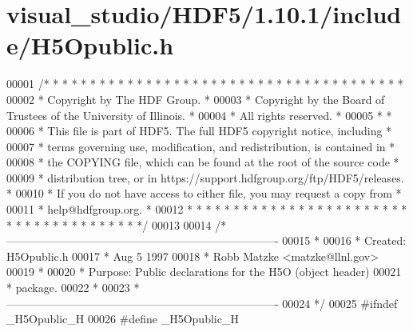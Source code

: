 \hypertarget{visual__studio_2_h_d_f5_21_810_81_2include_2_h5_opublic_8h_source}{}\section{visual\+\_\+studio/\+H\+D\+F5/1.10.1/include/\+H5\+Opublic.h}
\label{visual__studio_2_h_d_f5_21_810_81_2include_2_h5_opublic_8h_source}

\begin{DoxyCode}
00001 \textcolor{comment}{/* * * * * * * * * * * * * * * * * * * * * * * * * * * * * * * * * * * * * * *}
00002 \textcolor{comment}{ * Copyright by The HDF Group.                                               *}
00003 \textcolor{comment}{ * Copyright by the Board of Trustees of the University of Illinois.         *}
00004 \textcolor{comment}{ * All rights reserved.                                                      *}
00005 \textcolor{comment}{ *                                                                           *}
00006 \textcolor{comment}{ * This file is part of HDF5.  The full HDF5 copyright notice, including     *}
00007 \textcolor{comment}{ * terms governing use, modification, and redistribution, is contained in    *}
00008 \textcolor{comment}{ * the COPYING file, which can be found at the root of the source code       *}
00009 \textcolor{comment}{ * distribution tree, or in https://support.hdfgroup.org/ftp/HDF5/releases.  *}
00010 \textcolor{comment}{ * If you do not have access to either file, you may request a copy from     *}
00011 \textcolor{comment}{ * help@hdfgroup.org.                                                        *}
00012 \textcolor{comment}{ * * * * * * * * * * * * * * * * * * * * * * * * * * * * * * * * * * * * * * */}
00013 
00014 \textcolor{comment}{/*-------------------------------------------------------------------------}
00015 \textcolor{comment}{ *}
00016 \textcolor{comment}{ * Created:             H5Opublic.h}
00017 \textcolor{comment}{ *                      Aug  5 1997}
00018 \textcolor{comment}{ *                      Robb Matzke <matzke@llnl.gov>}
00019 \textcolor{comment}{ *}
00020 \textcolor{comment}{ * Purpose:             Public declarations for the H5O (object header)}
00021 \textcolor{comment}{ *                      package.}
00022 \textcolor{comment}{ *}
00023 \textcolor{comment}{ *-------------------------------------------------------------------------}
00024 \textcolor{comment}{ */}
00025 \textcolor{preprocessor}{#ifndef \_H5Opublic\_H}
00026 \textcolor{preprocessor}{#define \_H5Opublic\_H}

\end{DoxyCode}
